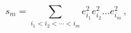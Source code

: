 \begin{equation}
s_{m}=\sum_{i_{1}<i_{2}<\cdots <i_{m}}e_{i_{1}}^{2}e_{i_{2}}^{2}\ldots
e_{i_{m}}^{2}\,,
\end{equation}

